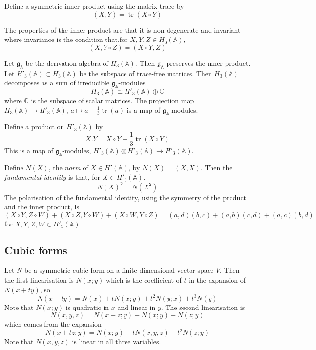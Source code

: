 \documentclass[12pt]{amsart}
\DeclareMathOperator{\tr}{tr}
\newcommand{\Dfn}[1]{\emph{\color{blue}#1}}
\newcommand\bA{\mathbb{A}}
\newcommand\bC{\mathbb{C}}
\newcommand\fg{\mathfrak{g}}
\begin{document}
Define a symmetric inner product using the matrix trace by
\begin{equation*}
	(X,Y) = \tr (X\circ Y)
\end{equation*}

The properties of the inner product are that it is non-degenerate and invariant where invariance
is the condition that,for $X,Y,Z\in H_3(\bA)$,
\begin{equation*}
	(X,Y\circ Z) = (X\circ Y,Z)
\end{equation*}

Let $\fg_\bA$ be the derivation algebra of $H_3(\bA)$. Then $\fg_\bA$ preserves the inner product.
Let $H'_3(\bA)\subset H_3(\bA)$ be the subspace of trace-free matrices. Then $H_3(\bA)$ decomposes
as a sum of irreducible $\fg_\bA$-modules
\begin{equation*}
	H_3(\bA) \cong H'_3(\bA) \oplus \bC
\end{equation*}
where $\bC$ is the subspace of scalar matrices.
The projection map $H_3(\bA) \to H'_3(\bA)$, $a\mapsto a-\frac13 \tr(a)$ is a map of $\fg_\bA$-modules.

Define a product on $H'_3(\bA)$ by
\begin{equation*}
	X.Y = X\circ Y - \frac13 \tr(X\circ Y)
\end{equation*}
This is a map of $\fg_\bA$-modules, $H'_3(\bA)\otimes H'_3(\bA)\to H'_3(\bA)$.

Define $N(X)$, the \Dfn{norm} of $X\in H'(\bA)$, by $N(X) = (X,X)$.
Then the \Dfn{fundamental identity} is that, for $X\in H'_3(\bA)$.
\begin{equation*}
	N(X)^2 = N(X^2)
\end{equation*}
The polarisation of the fundamental identity, using the symmetry of the product and the inner product, is
\begin{equation}
	(X\circ Y, Z\circ W) + (X\circ Z, Y\circ W) + (X\circ W,Y\circ Z)
	= (a,d)(b,c) + (a,b)(c,d) + (a,c)(b,d)
\end{equation}
for $X,Y,Z,W\in H'_3(\bA)$.

\subsection{Cubic forms}
Let $N$ be a symmetric cubic form on a finite dimensional vector space $V$. Then the first linearisation is $N(x;y)$ which is the coefficient
of $t$ in the expansion of $N(x+ty)$, so
\begin{equation*}
	N(x+ty) = N(x) + tN(x;y) + t^2N(y;x) + t^3N(y)
\end{equation*}
Note that $N(x;y)$ is quadratic in $x$ and linear in $y$. The second linearisation is 
\begin{equation*}
	N(x,y,z) = N(x+z;y) - N(x;y) - N(z;y)
\end{equation*}
which comes from the expansion
\begin{equation*}
	N(x+tz;y) = N(x;y) + tN(x,y,z) + t^2N(z;y)
\end{equation*}
Note that $N(x,y,z)$ is linear in all three variables.
\end{document}
